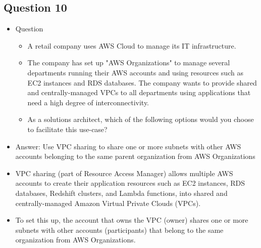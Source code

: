 \documentclass[]{scrartcl}
\begin{document}
\subsection{Question 10}
\begin{itemize}
	\item Question
	\begin{itemize}
		\item A retail company uses AWS Cloud to manage its IT infrastructure. 
		\item The company has set up "AWS Organizations" to manage several departments running their AWS accounts and using resources such as EC2 instances and RDS databases. The company wants to provide shared and centrally-managed VPCs to all departments using applications that need a high degree of interconnectivity.
		\item As a solutions architect, which of the following options would you choose to facilitate this use-case?
	\end{itemize}
	\item Answer: Use VPC sharing to share one or more subnets with other AWS accounts belonging to the same parent organization from AWS Organizations
	\item VPC sharing (part of Resource Access Manager) allows multiple AWS accounts to create their application resources such as EC2 instances, RDS databases, Redshift clusters, and Lambda functions, into shared and centrally-managed Amazon Virtual Private Clouds (VPCs). 
	\item To set this up, the account that owns the VPC (owner) shares one or more subnets with other accounts (participants) that belong to the same organization from AWS Organizations.
\end{itemize}
\end{document}
